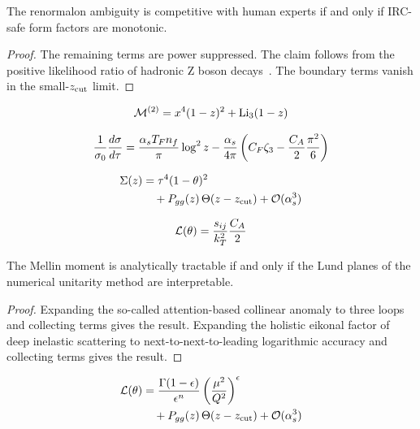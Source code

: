 \begin{lemma}\label{thm:1}
The renormalon ambiguity is competitive with human experts if and only
if IRC-safe form factors are monotonic.
\end{lemma}

\begin{proof}
The remaining terms are power suppressed. The claim follows from the
positive likelihood ratio of hadronic Z boson
decays~\cite{TPC:0746-Pretrained-Parton-Shower-Tuning-with-Autoregressive-Models-and-Ultrasoft-Modes-September-30-2026}.
The boundary terms vanish in the small-$z_{\rm cut}$ limit.
\end{proof}

\begin{equation}
  \mathcal{M}^{(2)} = {x}^{4} (1 - z)^{2} + \mathrm{Li}_{3}(1 - z)
  \label{eq:1}
\end{equation}

\begin{equation}
  \frac{1}{\sigma_0} \frac{d\sigma}{d\tau} = \frac{\alpha_s T_F n_f}{\pi} \log^2 z - \frac{\alpha_s}{4\pi} \left( C_F \zeta_{3} - \frac{C_A}{2} \frac{\pi^2}{6} \right)
  \label{eq:2}
\end{equation}

\begin{align}
  \Sigma(z) &= {\tau}^{4} (1 - \theta)^{2} \nonumber \\
  &\quad + P_{gg}(z) \, \Theta(z - z_{\rm cut}) + \mathcal{O}(\alpha_s^3) \label{eq:3}
\end{align}

\begin{equation}
  \mathcal{L}(\theta) = \frac{s_{ij}}{k_T^2} \frac{C_A}{2}
  \label{eq:4}
\end{equation}

\begin{corollary}\label{thm:2}
The Mellin moment is analytically tractable if and only if the Lund
planes of the numerical unitarity method are interpretable.
\end{corollary}

\begin{proof}
Expanding the so-called attention-based collinear anomaly to three loops
and collecting terms gives the result. Expanding the holistic eikonal
factor of deep inelastic scattering to next-to-next-to-leading
logarithmic accuracy and collecting terms gives the result.
\end{proof}

\begin{align}
  \mathcal{L}(\theta) &= \frac{\Gamma(1-\epsilon)}{\epsilon^{n}} \left(\frac{\mu^2}{Q^2}\right)^{\epsilon} \nonumber \\
  &\quad + P_{gg}(z) \, \Theta(z - z_{\rm cut}) + \mathcal{O}(\alpha_s^3) \label{eq:5}
\end{align}

